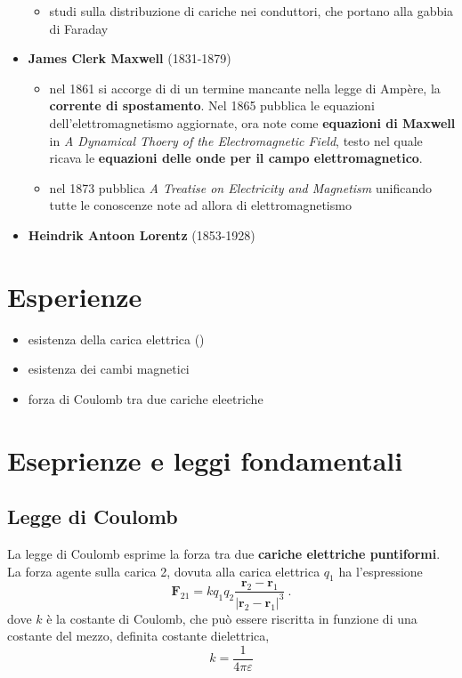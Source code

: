 \begin{itemize}
\begin{itemize}
            \item studi sulla distribuzione di cariche nei conduttori, che portano alla gabbia di Faraday
        \end{itemize}
    \item \textbf{James Clerk Maxwell} (1831-1879) 
    \begin{itemize}
        \item nel 1861 si accorge di di un termine mancante nella legge di Ampère, la \textbf{corrente di spostamento}. Nel 1865 pubblica le equazioni dell'elettromagnetismo aggiornate, ora note come \textbf{equazioni di Maxwell} in \textit{A Dynamical Thoery of the Electromagnetic Field}, testo nel quale ricava le \textbf{equazioni delle onde per il campo elettromagnetico}.
        \item nel 1873 pubblica \textit{A Treatise on Electricity and Magnetism} unificando tutte le conoscenze note ad allora di elettromagnetismo
    \end{itemize}
    \item \textbf{Heindrik Antoon Lorentz} (1853-1928)
\end{itemize}

\section{Esperienze}
\begin{itemize}
    \item esistenza della carica elettrica ()
    \item esistenza dei cambi magnetici
    \item forza di Coulomb tra due cariche eleetriche
\end{itemize}

\section{Eseprienze e leggi fondamentali}
\subsection{Legge di Coulomb}
La legge di Coulomb esprime la forza tra due \textbf{cariche elettriche puntiformi}. La forza agente sulla carica 2, dovuta alla carica elettrica $q_1$ ha l'espressione
\begin{equation}
    \mathbf{F}_{21} = k q_1 q_2 \dfrac{\mathbf{r}_2 - \mathbf{r}_1}{|\mathbf{r}_2 - \mathbf{r}_1|^3} \ . 
\end{equation}
dove $k$ è la costante di Coulomb, che può essere riscritta in funzione di una costante del mezzo, definita costante dielettrica,
\begin{equation}
    k = \dfrac{1}{4 \pi \varepsilon}
\end{equation}

